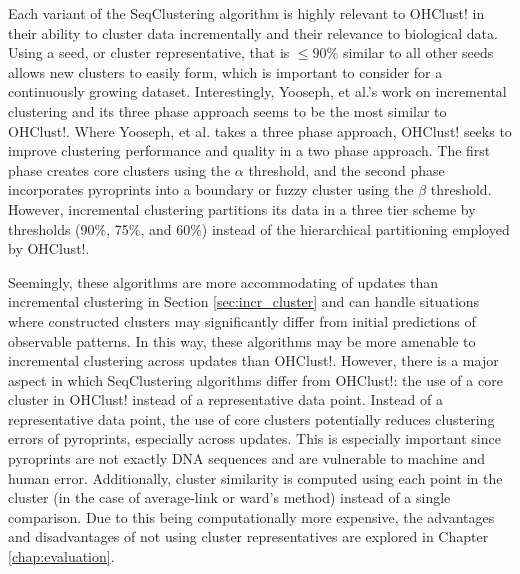 \documentclass[12pt]{ucthesis}
\begin{document}
   Each variant of the SeqClustering algorithm is highly relevant to OHClust!
   in their ability to cluster data incrementally and their relevance to
   biological data. Using a seed, or cluster representative, that is $\le 90\%$
   similar to all other seeds allows new clusters to easily form, which is
   important to consider for a continuously growing dataset. Interestingly,
   Yooseph, et al.'s work on incremental clustering and its three phase
   approach seems to be the most similar to OHClust!. Where Yooseph, et al.
   takes a three phase approach, OHClust! seeks to improve clustering
   performance and quality in a two phase approach. The first phase creates
   core clusters using the $\alpha$ threshold, and the second phase
   incorporates pyroprints into a boundary or fuzzy cluster using the $\beta$
   threshold. However, incremental clustering partitions its data in a three
   tier scheme by thresholds (90\%, 75\%, and 60\%) instead of the hierarchical
   partitioning employed by OHClust!.
   
   Seemingly, these algorithms are more accommodating of updates than
   incremental clustering in Section \ref{sec:incr_cluster} and can handle
   situations where constructed clusters may significantly differ from initial
   predictions of observable patterns. In this way, these algorithms may be
   more amenable to incremental clustering across updates than OHClust!.
   However, there is a major aspect in which SeqClustering algorithms differ
   from OHClust!: the use of a core cluster in OHClust! instead of a
   representative data point. Instead of a representative data point, the use
   of core clusters potentially reduces clustering errors of pyroprints,
   especially across updates. This is especially important since pyroprints are
   not exactly DNA sequences and are vulnerable to machine and human error.
   Additionally, cluster similarity is computed using each point in the cluster
   (in the case of average-link or ward's method) instead of a single
   comparison. Due to this being computationally more expensive, the advantages
   and disadvantages of not using cluster representatives are explored in
   Chapter \ref{chap:evaluation}.
\end{document}
